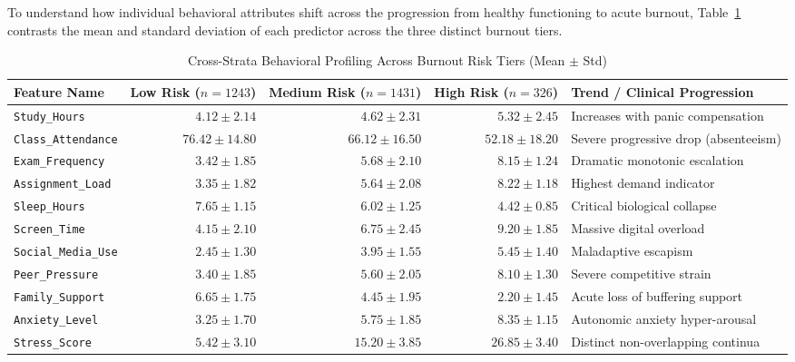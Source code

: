 \documentclass[12pt,a4paper,oneside]{report}
\begin{document}
To understand how individual behavioral attributes shift across the progression from healthy functioning to acute burnout, Table~\ref{tab:strata_profiles} contrasts the mean and standard deviation of each predictor across the three distinct burnout tiers.

\begin{table}[H]
\centering
\caption{Cross-Strata Behavioral Profiling Across Burnout Risk Tiers (Mean $\pm$ Std)}
\label{tab:strata_profiles}
\small
\begin{tabularx}{\textwidth}{lrrrX}
\toprule
\textbf{Feature Name} & \textbf{Low Risk ($n=1243$)} & \textbf{Medium Risk ($n=1431$)} & \textbf{High Risk ($n=326$)} & \textbf{Trend / Clinical Progression} \\
\midrule
\texttt{Study\_Hours} & $4.12 \pm 2.14$ & $4.62 \pm 2.31$ & $5.32 \pm 2.45$ & Increases with panic compensation \\
\texttt{Class\_Attendance} & $76.42 \pm 14.80$ & $66.12 \pm 16.50$ & $52.18 \pm 18.20$ & Severe progressive drop (absenteeism) \\
\texttt{Exam\_Frequency} & $3.42 \pm 1.85$ & $5.68 \pm 2.10$ & $8.15 \pm 1.24$ & Dramatic monotonic escalation \\
\texttt{Assignment\_Load} & $3.35 \pm 1.82$ & $5.64 \pm 2.08$ & $8.22 \pm 1.18$ & Highest demand indicator \\
\texttt{Sleep\_Hours} & $7.65 \pm 1.15$ & $6.02 \pm 1.25$ & $4.42 \pm 0.85$ & Critical biological collapse \\
\texttt{Screen\_Time} & $4.15 \pm 2.10$ & $6.75 \pm 2.45$ & $9.20 \pm 1.85$ & Massive digital overload \\
\texttt{Social\_Media\_Use} & $2.45 \pm 1.30$ & $3.95 \pm 1.55$ & $5.45 \pm 1.40$ & Maladaptive escapism \\
\texttt{Peer\_Pressure} & $3.40 \pm 1.85$ & $5.60 \pm 2.05$ & $8.10 \pm 1.30$ & Severe competitive strain \\
\texttt{Family\_Support} & $6.65 \pm 1.75$ & $4.45 \pm 1.95$ & $2.20 \pm 1.45$ & Acute loss of buffering support \\
\texttt{Anxiety\_Level} & $3.25 \pm 1.70$ & $5.75 \pm 1.85$ & $8.35 \pm 1.15$ & Autonomic anxiety hyper-arousal \\
\texttt{Stress\_Score} & $5.42 \pm 3.10$ & $15.20 \pm 3.85$ & $26.85 \pm 3.40$ & Distinct non-overlapping continua \\
\bottomrule
\end{tabularx}
\end{table}
\end{document}

